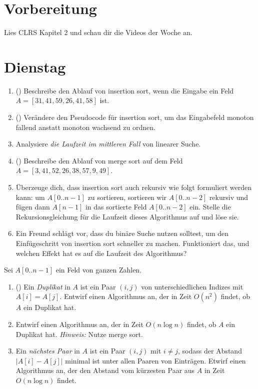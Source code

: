 \documentclass{uebung_cs}
\begin{document}
\section*{Vorbereitung}
Lies CLRS Kapitel 2 und schau dir die Videos der Woche an.

\section*{Dienstag}

\begin{aufgabe}\label{tue-first}\mbox{}
	\begin{enumerate}
		\item (\warmup) Beschreibe den Ablauf von insertion sort, wenn die Eingabe ein Feld $A=[31,41,59,26,41,58]$ ist.
		\item (\warmup) Verändere den Pseudocode für insertion sort, um das Eingabefeld monoton fallend anstatt monoton wachsend zu ordnen.	
		\item Analysiere \emph{die Laufzeit im mittleren Fall} von linearer Suche.
		\item (\warmup) Beschreibe den Ablauf von merge sort auf dem Feld $A=[3,41,52,26,38,57,9,49]$.
		\item Überzeuge dich, dass insertion sort auch rekursiv wie folgt formuliert werden kann: um $A[0..n-1]$ zu sortieren, sortieren wir $A[0..n-2]$ rekursiv und fügen dann $A[n-1]$ in das sortierte Feld $A[0..n-2]$ ein. Stelle die Rekursionsgleichung für die Laufzeit dieses Algorithmus auf und löse sie.
		\item Ein Freund schlägt vor, dass du binäre Suche nutzen solltest, um den Einfügeschritt von insertion sort schneller zu machen. Funktioniert das, und welchen Effekt hat es auf die Laufzeit des Algorithmus?
	\end{enumerate}
\end{aufgabe}

\begin{aufgabe}
	Sei $A[0..n-1]$ ein Feld von ganzen Zahlen.
	\begin{enumerate}
		\item (\warmup) Ein \emph{Duplikat} in $A$ ist ein Paar $(i,j)$ von unterschiedlichen Indizes mit $A[i]=A[j]$. Entwirf einen Algorithmus an, der in Zeit $O(n^2)$ findet, ob $A$ ein Duplikat hat.
		\item Entwirf einen Algorithmus an, der in Zeit $O(n\log n)$ findet, ob $A$ ein Duplikat hat. \emph{Hinweis:} Nutze merge sort.
		\item Ein \emph{nächstes Paar} in $A$ ist ein Paar $(i,j)$ mit $i\ne j$, sodass der Abstand $|A[i]-A[j]|$ minimal ist unter allen Paaren von Einträgen.
		Etwirf einen Algorithmus an, der den Abstand vom kürzesten Paar aus $A$ in Zeit $O(n\log n)$ findet.
	\end{enumerate}
\end{aufgabe}
\end{document}
